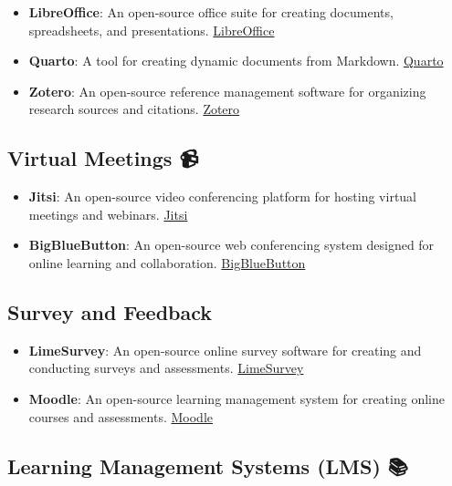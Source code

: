 \documentclass[
  letterpaper,
  DIV=11,
  numbers=noendperiod]{scrreprt}
\begin{document}
\begin{itemize}
\item
  \textbf{LibreOffice}: An open-source office suite for creating
  documents, spreadsheets, and presentations.
  \href{https://www.libreoffice.org/}{LibreOffice}
\item
  \textbf{Quarto}: A tool for creating dynamic documents from Markdown.
  \href{https://quarto.org/}{Quarto}
\item
  \textbf{Zotero}: An open-source reference management software for
  organizing research sources and citations.
  \href{https://www.zotero.org/}{Zotero}
\end{itemize}

\subsection{Virtual Meetings 📹}\label{virtual-meetings}

\begin{itemize}
\item
  \textbf{Jitsi}: An open-source video conferencing platform for hosting
  virtual meetings and webinars. \href{https://jitsi.org/}{Jitsi}
\item
  \textbf{BigBlueButton}: An open-source web conferencing system
  designed for online learning and collaboration.
  \href{https://bigbluebutton.org/}{BigBlueButton}
\end{itemize}

\subsection{Survey and Feedback 📝}\label{survey-and-feedback}

\begin{itemize}
\item
  \textbf{LimeSurvey}: An open-source online survey software for
  creating and conducting surveys and assessments.
  \href{https://www.limesurvey.org/}{LimeSurvey}
\item
  \textbf{Moodle}: An open-source learning management system for
  creating online courses and assessments.
  \href{https://moodle.org/}{Moodle}
\end{itemize}

\subsection{Learning Management Systems (LMS)
📚}\label{learning-management-systems-lms}
\end{document}
